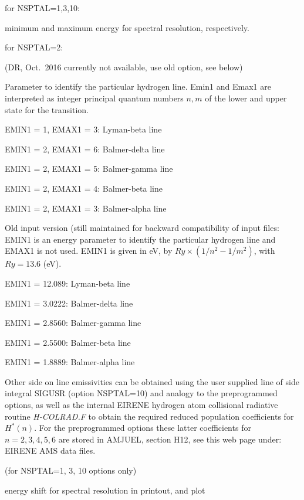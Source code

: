 \begin{description}
        for NSPTAL=1,3,10:

        minimum and maximum energy for spectral resolution, respectively.

        for NSPTAL=2:

        \textcolor[rgb]{1.00,0.00,0.00}{(DR, Oct.\ 2016 currently not
          available, use old option, see below)}

        Parameter to identify the particular hydrogen line.
        Emin1 and Emax1 are interpreted as integer principal quantum numbers $n,m$ of
        the lower and upper state for the transition.

        EMIN1 = 1, EMAX1 = 3:  Lyman-beta line 

        EMIN1 = 2, EMAX1 = 6:  Balmer-delta line 

        EMIN1 = 2, EMAX1 = 5:  Balmer-gamma line 

        EMIN1 = 2, EMAX1 = 4:  Balmer-beta line 

        EMIN1 = 2, EMAX1 = 3:  Balmer-alpha line 

        Old input version (still maintained for backward compatibility of input files:
        EMIN1 is an energy parameter to identify the particular hydrogen line and EMAX1
        is not used.
        EMIN1 is given in \si{\electronvolt}, by $Ry \times \left(1/n^2-1/m^2\right)$,
        with $Ry=\num{13.6}$ (\si{\electronvolt}).

        EMIN1 = 12.089: Lyman-beta line 

        EMIN1 = 3.0222: Balmer-delta line 

        EMIN1 = 2.8560: Balmer-gamma line 

        EMIN1 = 2.5500: Balmer-beta line 

        EMIN1 = 1.8889: Balmer-alpha line 

        Other side on line emissivities can be obtained using the user supplied line of
        side integral SIGUSR (option NSPTAL=10) and analogy to the preprogrammed
        options, as well as the internal EIRENE hydrogen atom collisional radiative
        routine \emph{H-COLRAD.F} to obtain the required reduced population
        coefficients for $H^*(n)$.
        For the preprogrammed options these latter coefficients for $n=2,3,4,5,6$ are
        stored in AMJUEL, section H12, see this web page under: EIRENE AMS data files.

  \item[ESHIFT] (for NSPTAL=1, 3, 10 options only) 

        energy shift for spectral resolution in printout, and plot
\end{description}

